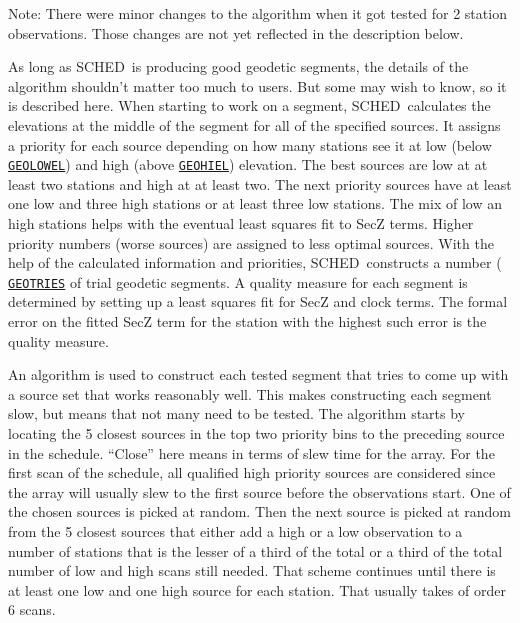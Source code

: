 \documentclass{report}
\newcommand{\schedb}{{\sc SCHED~}}
\begin{document}
Note:  There were minor changes to the algorithm when it got tested
for 2 station observations.  Those changes are not yet reflected in
the description below.

As long as \schedb is producing good geodetic segments, the details of
the algorithm shouldn't matter too much to users.  But some may wish
to know, so it is described here.  When starting to work on a segment,
\schedb calculates the elevations at the middle of the segment for all
of the specified sources.  It assigns a priority for each source
depending on how many stations see it at low (below 
{\hyperref[MP:GEOLOWEL]{{\tt GEOLOWEL}}}) and high (above 
{\hyperref[MP:GEOHIEL]{{\tt GEOHIEL}}}) elevation.
The best sources are low at at
least two stations and high at at least two.  The next priority
sources have at least one low and three high stations or at least
three low stations.  The mix of low an high stations helps with the
eventual least squares fit to SecZ terms.  Higher priority numbers
(worse sources) are assigned to less optimal sources.  With the help
of the calculated information and priorities, \schedb constructs a
number (
{\hyperref[MP:GEOTRIES]{{\tt GEOTRIES}}} of trial geodetic
segments.  A quality measure for each segment is determined by setting
up a least squares fit for SecZ and clock terms.  The formal error on
the fitted SecZ term for the station with the highest such error is
the quality measure.

An algorithm is used to construct each tested segment that tries to
come up with a source set that works reasonably well.  This makes
constructing each segment slow, but means that not many need to be
tested.  The algorithm starts by locating the 5 closest sources in the
top two priority bins to the preceding source in the schedule.
``Close'' here means in terms of slew time for the array.  For the
first scan of the schedule, all qualified high priority sources
are considered since the array will usually slew to the first source
before the observations start.  One of the chosen sources is picked at
random.  Then the next source is picked at random from the 5 closest
sources that either add a high or a low observation to a number of stations
that is the lesser of a third of the total or a third of the total number
of low and high scans still needed.  That scheme continues until
there is at least one low and one high source for each station.  That usually
takes of order 6 scans.
\end{document}
